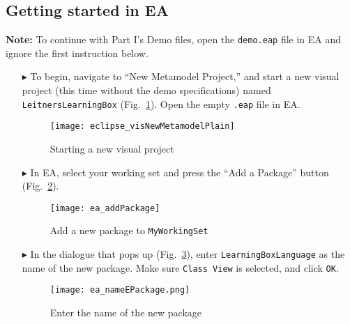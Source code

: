 \newpage
\hypertarget{static:starting vis}{}
\subsection{Getting started in EA}
\visHeader
  
{\bf Note:} To continue with Part I's Demo files, open the \texttt{demo.eap} file in EA and ignore the first instruction below.

\begin{itemize}

\item[$\blacktriangleright$]  To begin, navigate to ``New Metamodel Project,'' and start a new visual project (this time without the demo specifications)
named \texttt{Leit\-ners\-Learn\-ing\-Box} (Fig.~\ref{fig:new_visModel}). Open the empty \texttt{.eap} file in EA.

\vspace{0.5cm}

\begin{figure}[htbp]
	\centering
  \texttt{[image: eclipse\_visNewMetamodelPlain]}
	\caption{Starting a new visual project}
	\label{fig:new_visModel}
\end{figure}

\vspace{0.5cm}

\item[$\blacktriangleright$] In EA, select your working set and press the ``Add a Package'' button (Fig.~\ref{fig:new_package}). 

\begin{figure}[htbp]
	\centering
  \texttt{[image: ea\_addPackage]}
	\caption{Add a new package to \texttt{MyWorkingSet}}
	\label{fig:new_package}
	\vspace{0.5cm}
\end{figure}

\clearpage

\item[$\blacktriangleright$] In the dialogue that pops up (Fig.~\ref{fig:new_package_name}), enter \texttt{LearningBoxLanguage} as the name of the new
package. Make sure \texttt{Class View} is selected, and click \texttt{OK}.

\vspace{0.5cm}

\begin{figure}[htbp]
	\centering
    \texttt{[image: ea\_nameEPackage.png]}
	\caption{Enter the name of the new package}
	\label{fig:new_package_name}
\end{figure}
\FloatBarrier


\end{itemize}
